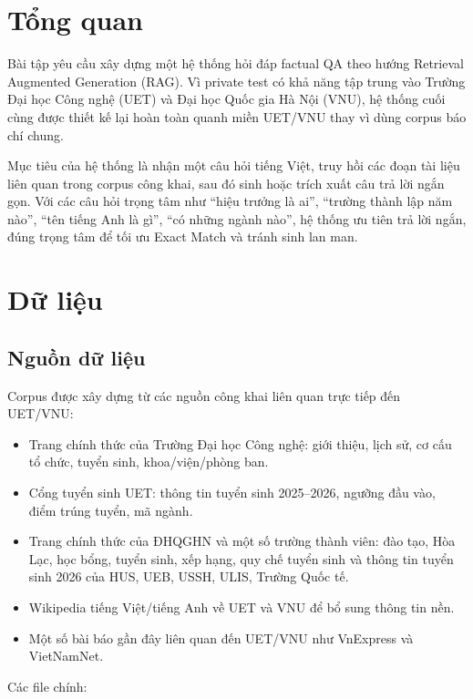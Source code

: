 \documentclass[12pt,a4paper]{article}
\begin{document}
\newpage

\section{Tổng quan}

Bài tập yêu cầu xây dựng một hệ thống hỏi đáp factual QA theo hướng Retrieval Augmented Generation (RAG). Vì private test có khả năng tập trung vào Trường Đại học Công nghệ (UET) và Đại học Quốc gia Hà Nội (VNU), hệ thống cuối cùng được thiết kế lại hoàn toàn quanh miền UET/VNU thay vì dùng corpus báo chí chung.

Mục tiêu của hệ thống là nhận một câu hỏi tiếng Việt, truy hồi các đoạn tài liệu liên quan trong corpus công khai, sau đó sinh hoặc trích xuất câu trả lời ngắn gọn. Với các câu hỏi trọng tâm như ``hiệu trưởng là ai'', ``trường thành lập năm nào'', ``tên tiếng Anh là gì'', ``có những ngành nào'', hệ thống ưu tiên trả lời ngắn, đúng trọng tâm để tối ưu Exact Match và tránh sinh lan man.

\section{Dữ liệu}

\subsection{Nguồn dữ liệu}

Corpus được xây dựng từ các nguồn công khai liên quan trực tiếp đến UET/VNU:

\begin{itemize}
  \item Trang chính thức của Trường Đại học Công nghệ: giới thiệu, lịch sử, cơ cấu tổ chức, tuyển sinh, khoa/viện/phòng ban.
  \item Cổng tuyển sinh UET: thông tin tuyển sinh 2025--2026, ngưỡng đầu vào, điểm trúng tuyển, mã ngành.
  \item Trang chính thức của ĐHQGHN và một số trường thành viên: đào tạo, Hòa Lạc, học bổng, tuyển sinh, xếp hạng, quy chế tuyển sinh và thông tin tuyển sinh 2026 của HUS, UEB, USSH, ULIS, Trường Quốc tế.
  \item Wikipedia tiếng Việt/tiếng Anh về UET và VNU để bổ sung thông tin nền.
  \item Một số bài báo gần đây liên quan đến UET/VNU như VnExpress và VietNamNet.
\end{itemize}

Các file chính:
\end{document}
